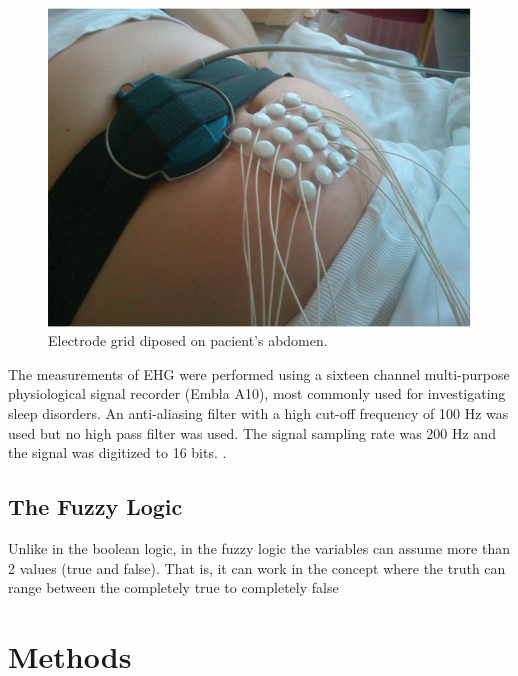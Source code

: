 \documentclass[bioengineering,article,submit,moreauthors,pdftex,10pt,a4paper]{mdpi}
\begin{document}
\begin{figure}[H]
	\caption{\label{recording_setup} Electrode grid diposed on pacient's abdomen.}
	\begin{center}
		\includegraphics[scale=0.6]{imagens/coletaBaseIrlanda.png} 		
	\end{center}
\end{figure}

The measurements of EHG were performed using a sixteen channel multi-purpose physiological signal recorder (Embla A10), most commonly used for investigating sleep disorders. An anti-aliasing filter with a high cut-off frequency of 100 Hz was used but no high pass filter was used. The signal sampling rate was 200 Hz and the signal was digitized to 16 bits.  \cite{ref-islddatabase}.

 

\subsection{The Fuzzy Logic}
 
Unlike in the boolean logic, in the fuzzy logic the variables can assume more than 2 values (true and false). That is, it can work in the concept where the truth can range between the completely true to completely false \cite{ref-novak}
 
 
\section{Methods}
\end{document}
